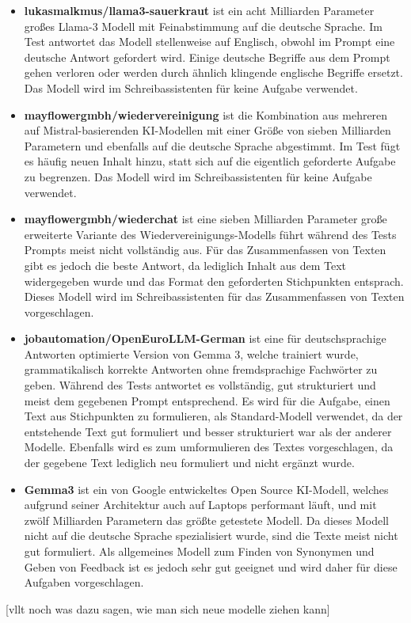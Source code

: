 \documentclass[../main.tex]{subfiles}
\begin{document}
\begin{itemize}

\item \textbf{lukasmalkmus/llama3-sauerkraut} ist ein acht Milliarden Parameter großes Llama-3 Modell mit Feinabstimmung auf die deutsche Sprache\cite{sauerkraut}. Im Test antwortet das Modell stellenweise auf Englisch, obwohl im Prompt eine deutsche Antwort gefordert wird. Einige deutsche Begriffe aus dem Prompt gehen verloren oder werden durch ähnlich klingende englische Begriffe ersetzt. Das Modell wird im Schreibassistenten für keine Aufgabe verwendet.

\item \textbf{mayflowergmbh/wiedervereinigung} ist die Kombination aus mehreren auf Mistral-basierenden KI-Modellen mit einer Größe von sieben Milliarden Parametern und ebenfalls auf die deutsche Sprache abgestimmt\cite{wiedervereinigung}. Im Test fügt es häufig neuen Inhalt hinzu, statt sich auf die eigentlich geforderte Aufgabe zu begrenzen. Das Modell wird im Schreibassistenten für keine Aufgabe verwendet.

\item \textbf{mayflowergmbh/wiederchat} ist eine sieben Milliarden Parameter große erweiterte Variante des Wiedervereinigungs-Modells führt während des Tests Prompts meist nicht vollständig aus\cite{wiederchat}. Für das Zusammenfassen von Texten gibt es jedoch die beste Antwort, da lediglich Inhalt aus dem Text widergegeben wurde und das Format den geforderten Stichpunkten entsprach. Dieses Modell wird im Schreibassistenten für das Zusammenfassen von Texten vorgeschlagen.

\item \textbf{jobautomation/OpenEuroLLM-German} ist eine für deutschsprachige Antworten optimierte Version von Gemma 3, welche trainiert wurde, grammatikalisch korrekte Antworten ohne fremdsprachige Fachwörter zu geben\cite{openeurollm}. Während des Tests antwortet es vollständig, gut strukturiert und meist dem gegebenen Prompt entsprechend. Es wird für die Aufgabe, einen Text aus Stichpunkten zu formulieren, als Standard-Modell verwendet, da der entstehende Text gut formuliert und besser strukturiert war als der anderer Modelle. Ebenfalls wird es zum umformulieren des Textes vorgeschlagen, da der gegebene Text lediglich neu formuliert und nicht ergänzt wurde.  

\item \textbf{Gemma3} ist ein von Google entwickeltes Open Source KI-Modell, welches aufgrund seiner Architektur auch auf Laptops performant läuft, und mit zwölf Milliarden Parametern das größte getestete Modell\cite{gemma3}. Da dieses Modell nicht auf die deutsche Sprache spezialisiert wurde, sind die Texte meist nicht gut formuliert. Als allgemeines Modell zum Finden von Synonymen und Geben von Feedback ist es jedoch sehr gut geeignet und wird daher für diese Aufgaben vorgeschlagen. 

\end{itemize}

[vllt noch was dazu sagen, wie man sich neue modelle ziehen kann]
\end{document}
